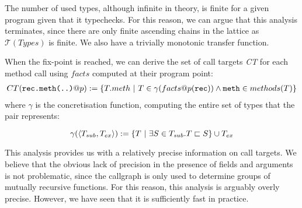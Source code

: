 The number of used types, although infinite in theory, is finite for a given
program given that it typechecks. For this reason, we can argue that this
analysis terminates, since there are only finite ascending chains in the
lattice as $\mathcal{T}(Types)$ is finite. We also have a trivially monotonic
transfer function.

When the fix-point is reached, we can derive the set of call targets \emph{CT}
for each method call using $facts$ computed at their program point:
\begin{eqnarray*}
    CT(\verb/rec.meth(..)/ @ p) := \{ T.meth ~|~ T \in \gamma(facts@p(\verb/rec/)) \land \verb/meth/ \in methods(T) \}
\end{eqnarray*}
where $\gamma$ is the concretisation function, computing the entire set of
types that the pair represents:

$$
\gamma(\langle T_{sub}, T_{ex} \rangle ) := \{ T ~|~ \exists S \in T_{sub}. T \sqsubset S\} \cup T_{ex}
$$

This analysis provides us with a relatively precise information on call
targets. We believe that the obvious lack of precision in the presence of
fields and arguments is not problematic, since the callgraph is only used to
determine groups of mutually recursive functions. For this reason, this
analysis is arguably overly precise. However, we have seen that it is
sufficiently fast in practice.
